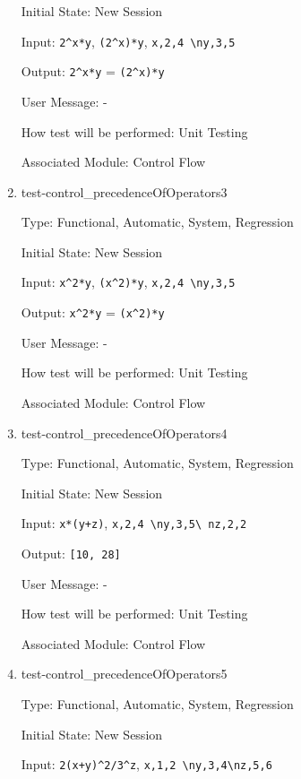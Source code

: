 \documentclass[12pt, titlepage]{article}
\begin{document}
\begin{enumerate}
	Initial State: New Session
	
	Input: \texttt{2\textasciicircum x*y}, \texttt{(2\textasciicircum x)*y}, 
	\texttt{x,2,4 \textbackslash ny,3,5}
	
	Output: \texttt{2\textasciicircum x*y} = \texttt{(2\textasciicircum x)*y}
	
	User Message: - 
	
	How test will be performed: Unit Testing
	
	Associated Module: Control Flow\\
	
	\item{test-control\_precedenceOfOperators3}
	
	Type: Functional, Automatic, System, Regression
	
	Initial State: New Session
	
	Input: \texttt{x\textasciicircum 2*y}, \texttt{(x\textasciicircum 2)*y}, 
	\texttt{x,2,4 \textbackslash ny,3,5}
	
	Output: \texttt{x\textasciicircum 2*y} = \texttt{(x\textasciicircum 2)*y}
	
	User Message: - 
	
	How test will be performed: Unit Testing
	
	Associated Module: Control Flow\\
	
	\item{test-control\_precedenceOfOperators4}
	
	Type: Functional, Automatic, System, Regression
	
	Initial State: New Session
	
	Input: \texttt{x*(y+z)}, \texttt{x,2,4 \textbackslash ny,3,5\textbackslash 
	nz,2,2}
	
	Output: \texttt{[10, 28]}
	
	User Message: - 
	
	How test will be performed: Unit Testing
	
	Associated Module: Control Flow\\
	
	\item{test-control\_precedenceOfOperators5}
	\label{userstudy_task}
	
	Type: Functional, Automatic, System, Regression
	
	Initial State: New Session
	
	Input: \texttt{2(x+y)\textasciicircum2/3\textasciicircum z}, \texttt{x,1,2 
	\textbackslash ny,3,4\textbackslash nz,5,6}
	

\end{enumerate}
\end{document}
